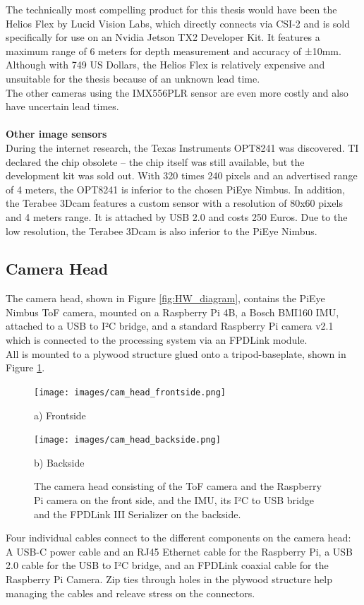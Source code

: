 The technically most compelling product for this thesis would have been the Helios Flex by Lucid Vision Labs, which directly connects via CSI-2 and is sold specifically for use on an Nvidia Jetson TX2 Developer Kit. It features a maximum range of 6 meters for depth measurement and accuracy of ±10mm. Although with 749 US Dollars, the Helios Flex is relatively expensive and unsuitable for the thesis because of an unknown lead time.\\
The other cameras using the IMX556PLR sensor are even more costly and also have uncertain lead times.\\
\\
\textbf{Other image sensors}\\
During the internet research, the Texas Instruments OPT8241 was discovered. TI declared the chip obsolete – the chip itself was still available, but the development kit was sold out. With 320 times 240 pixels and an advertised range of 4 meters, the OPT8241 is inferior to the chosen PiEye Nimbus. In addition, the Terabee 3Dcam features a custom sensor with a resolution of 80x60 pixels and 4 meters range. It is attached by USB 2.0 and costs 250 Euros. Due to the low resolution, the Terabee 3Dcam is also inferior to the PiEye Nimbus. 

\subsection{Camera Head}
\label{sec:camHead}
The camera head, shown in Figure \ref{fig:HW_diagram}, contains the PiEye Nimbus ToF camera, mounted on a Raspberry Pi 4B, a Bosch BMI160 IMU, attached to a USB to I²C bridge, and a standard Raspberry Pi camera v2.1 which is connected to the processing system via an FPDLink module.\\
All is mounted to a plywood structure glued onto a tripod-baseplate, shown in Figure \ref{fig:cameraHead}. 
\begin{figure}[H]
    \centering
    \begin{minipage}[b]{0.45\textwidth}
      \texttt{[image: images/cam\_head\_frontside.png]}
      \captionsetup{labelformat=empty}
      \caption{a) Frontside}
      \label{fig:cameraHeadfront} 
    \end{minipage} %
    \begin{minipage}[b]{0.45\textwidth}
      \texttt{[image: images/cam\_head\_backside.png]} 
      \captionsetup{labelformat=empty}
      \caption{b) Backside}
      \label{fig:cameraHeadback} 
    \end{minipage}
    \caption{The camera head consisting of the ToF camera and the Raspberry Pi camera on the front side, and the IMU, its I²C to USB bridge and the FPDLink III Serializer on the backside.}
    \label{fig:cameraHead}
  \end{figure}
Four individual cables connect to the different components on the camera head: A USB-C power cable and an RJ45 Ethernet cable for the Raspberry Pi, a USB 2.0 cable for the USB to I²C bridge, and an FPDLink coaxial cable for the Raspberry Pi Camera. Zip ties through holes in the plywood structure help managing the cables and releave stress on the connectors.
